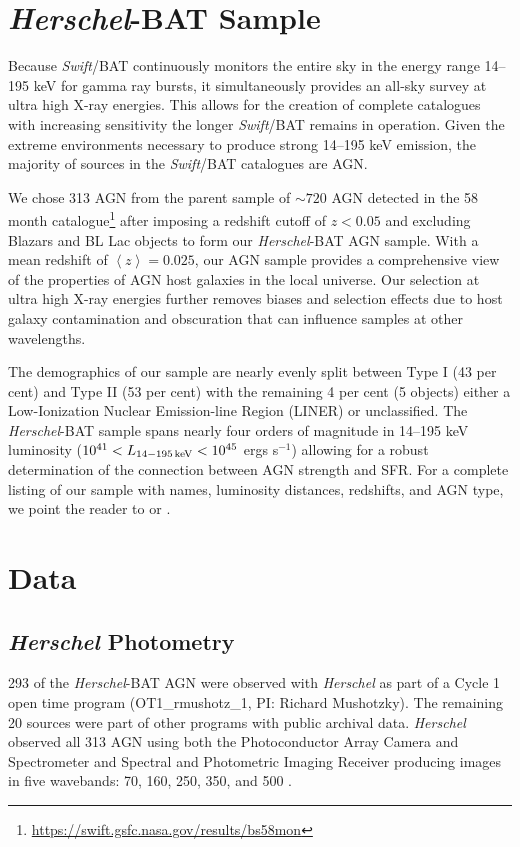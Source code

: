 \documentclass[fleqn, usenatbib]{mnras}
\newcommand{\herschel}{\emph{Herschel}}
\newcommand{\swift}{\textit{Swift}}
\begin{document}
\section{\herschel-BAT Sample}
Because \swift/BAT continuously monitors the entire sky in the energy range 14--195 keV for gamma ray bursts, it simultaneously provides an all-sky survey at ultra high X-ray energies. This allows for the creation of complete catalogues with increasing sensitivity the longer \swift/BAT remains in operation. Given the extreme environments necessary to produce strong 14--195 keV emission, the majority of sources in the \swift/BAT catalogues are AGN.

We chose 313 AGN from the parent sample of $\sim720$ AGN detected in the 58 month catalogue\footnote{\url{https://swift.gsfc.nasa.gov/results/bs58mon}} after imposing a redshift cutoff of $z<0.05$  and excluding Blazars and BL Lac objects to form our \herschel-BAT AGN sample. With a mean redshift of $\left<z\right> = 0.025$, our AGN sample provides a comprehensive view of the properties of AGN host galaxies in the local universe. Our selection at ultra high X-ray energies further removes biases and selection effects due to host galaxy contamination and obscuration \citep{Mushotzky:2004gf} that can influence samples at other wavelengths.   

The demographics of our sample are nearly evenly split between Type I (43 per cent) and Type II (53 per cent) with the remaining 4 per cent (5 objects) either a Low-Ionization Nuclear Emission-line Region (LINER) or unclassified. The \herschel-BAT sample spans nearly four orders of magnitude in 14--195 keV luminosity ($10^{41} < L_{\rm 14-195\,keV} < 10^{45}$ ergs s$^{-1}$) allowing for a robust determination of the connection between AGN strength and SFR. For a complete listing of our sample with names, luminosity distances, redshifts, and AGN type, we point the reader to \citet{Melendez:2014yu} or \citet{Shimizu:2016qy}.

\section{Data}
\subsection{\herschel{} Photometry}
293 of the \herschel{}-BAT AGN were observed with \herschel{} as part of a Cycle 1 open time program (OT1\_rmushotz\_1, PI: Richard Mushotzky). The remaining 20 sources were part of other programs with public archival data. \herschel{} observed all 313 AGN using both the Photoconductor Array Camera and Spectrometer \citep[PACS;][]{Poglitsch:2010fp} and Spectral and Photometric Imaging Receiver \citep[SPIRE;][]{Griffin:2010sf} producing images in five wavebands: 70, 160, 250, 350, and 500 \micron.
\end{document}
